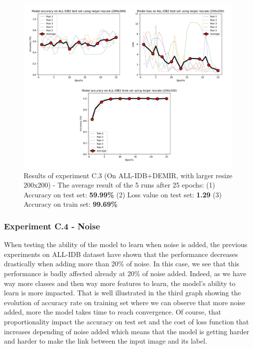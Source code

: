 \documentclass[11pt, openany]{report}
\theoremstyle{plain}
\theoremstyle{definition}
\theoremstyle{remark}
\begin{document}
\begin{figure}[H]
  \centering
  \includegraphics[scale=0.45]{Code/ch6-LeukemiaSubtypes/figures_result/ALL_IDB2/all_idb2-200x200.PNG}
  \caption{Results of experiment C.3 (On ALL-IDB+DEMIR, with larger resize 200x200) - The average result of the 5 runs after 25 epochs: (1) Accuracy on test set: \textbf{59.99\%} (2) Loss value on test set: \textbf{1.29} (3) Accuracy on train set: \textbf{99.69\%}}
  \label{fig:results-C3}
\end{figure}

\subsubsection{Experiment C.4 - Noise}

When testing the ability of the model to learn when noise is added, the previous experiments on ALL-IDB dataset have shown that the performance decreases drastically when adding more than 20\% of noise. In this case, we see that this performance is badly affected already at 20\% of noise added. Indeed, as we have way more classes and then way more features to learn, the model's ability to learn is more impacted. That is well illustrated in the third graph showing the evolution of accuracy rate on training set where we can observe that more noise added, more the model takes time to  reach convergence. Of course, that proportionality impact the accuracy on test set and the cost of loss function that increases depending of noise added which means that the model is getting harder and harder to make the link between the input image and its label.  
\end{document}
